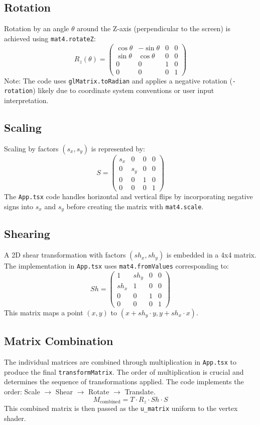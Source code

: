 \documentclass{article}
\begin{document}
\subsection{Rotation}
Rotation by an angle $\theta$ around the Z-axis (perpendicular to the screen) is achieved using \texttt{mat4.rotateZ}:
\[
R_z(\theta) =
\begin{pmatrix}
\cos\theta & -\sin\theta & 0 & 0 \\
\sin\theta & \cos\theta & 0 & 0 \\
0 & 0 & 1 & 0 \\
0 & 0 & 0 & 1
\end{pmatrix}
\]
Note: The code uses \texttt{glMatrix.toRadian} and applies a negative rotation (\texttt{-rotation}) likely due to coordinate system conventions or user input interpretation.

\subsection{Scaling}
Scaling by factors $(s_x, s_y)$ is represented by:
\[
S =
\begin{pmatrix}
s_x & 0 & 0 & 0 \\
0 & s_y & 0 & 0 \\
0 & 0 & 1 & 0 \\
0 & 0 & 0 & 1
\end{pmatrix}
\]
The \texttt{App.tsx} code handles horizontal and vertical flips by incorporating negative signs into $s_x$ and $s_y$ before creating the matrix with \texttt{mat4.scale}.

\subsection{Shearing}
A 2D shear transformation with factors $(sh_x, sh_y)$ is embedded in a 4x4 matrix. The implementation in \texttt{App.tsx} uses \texttt{mat4.fromValues} corresponding to:
\[
Sh =
\begin{pmatrix}
1 & sh_y & 0 & 0 \\
sh_x & 1 & 0 & 0 \\
0 & 0 & 1 & 0 \\
0 & 0 & 0 & 1
\end{pmatrix}
\]
This matrix maps a point $(x, y)$ to $(x + sh_y \cdot y, y + sh_x \cdot x)$.

\subsection{Matrix Combination}
The individual matrices are combined through multiplication in \texttt{App.tsx} to produce the final \texttt{transformMatrix}. The order of multiplication is crucial and determines the sequence of transformations applied. The code implements the order: Scale $\rightarrow$ Shear $\rightarrow$ Rotate $\rightarrow$ Translate.
\[
M_{\text{combined}} = T \cdot R_z \cdot Sh \cdot S
\]
This combined matrix is then passed as the \texttt{u\_matrix} uniform to the vertex shader.
\end{document}
